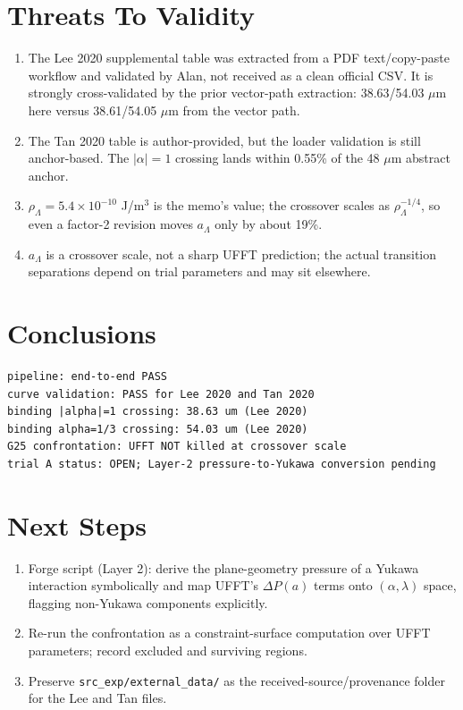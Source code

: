 \documentclass{article}
\begin{document}
\section{Threats To Validity}

\begin{enumerate}
\item The Lee 2020 supplemental table was extracted from a PDF text/copy-paste
   workflow and validated by Alan, not received as a clean official CSV.
   It is strongly cross-validated by the prior vector-path extraction:
   38.63/54.03 $\mu$m here versus 38.61/54.05 $\mu$m from the vector path.

\item The Tan 2020 table is author-provided, but the loader validation is still
   anchor-based. The $|\alpha|=1$ crossing lands within 0.55\% of the 48 $\mu$m
   abstract anchor.

\item $\rho_\Lambda=5.4\times10^{-10}$ J/m$^3$ is the memo's value; the
   crossover scales as $\rho_\Lambda^{-1/4}$, so even a factor-2 revision
   moves $a_\Lambda$ only by about 19\%.

\item $a_\Lambda$ is a crossover scale, not a sharp UFFT prediction; the actual
   transition separations depend on trial parameters and may sit elsewhere.
\end{enumerate}

\section{Conclusions}

\begin{lstlisting}
pipeline: end-to-end PASS
curve validation: PASS for Lee 2020 and Tan 2020
binding |alpha|=1 crossing: 38.63 um (Lee 2020)
binding alpha=1/3 crossing: 54.03 um (Lee 2020)
G25 confrontation: UFFT NOT killed at crossover scale
trial A status: OPEN; Layer-2 pressure-to-Yukawa conversion pending
\end{lstlisting}

\section{Next Steps}

\begin{enumerate}
\item Forge script (Layer 2): derive the plane-geometry pressure of a Yukawa
   interaction symbolically and map UFFT's $\Delta P(a)$ terms onto
   $(\alpha,\lambda)$ space, flagging non-Yukawa components explicitly.

\item Re-run the confrontation as a constraint-surface computation over UFFT
   parameters; record excluded and surviving regions.

\item Preserve \texttt{src\_exp/external\_data/} as the received-source/provenance folder
   for the Lee and Tan files.
\end{enumerate}
\end{document}
